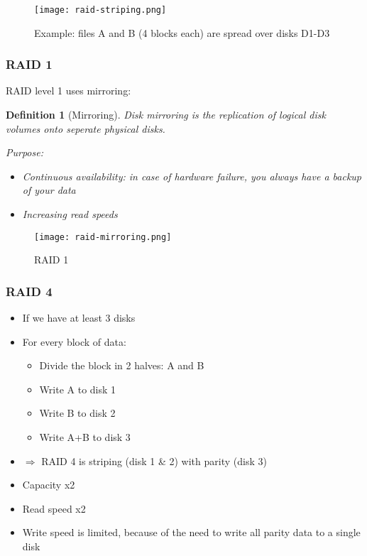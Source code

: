 \documentclass{article}
\newtheorem{theorem}{Definition}[section]
\begin{document}
\begin{figure}[H]
    \centering
    \texttt{[image: raid-striping.png]}
    \caption{Example: files A and B (4 blocks each) are spread over disks D1-D3}
\end{figure}


\subsubsection{RAID 1}

RAID level 1 uses mirroring:

\begin{theorem}[Mirroring]
    Disk mirroring is the replication of logical disk volumes onto seperate physical disks.

    Purpose:

    \begin{itemize}
        \item Continuous availability: in case of hardware failure, you always have a backup of your data
        \item Increasing read speeds
    \end{itemize}
\end{theorem}

\begin{figure}[H]
    \centering
    \texttt{[image: raid-mirroring.png]}
    \caption{RAID 1}
\end{figure}


\subsubsection{RAID 4}

\begin{itemize}
    \item If we have at least 3 disks
    \item For every block of data:
    \begin{itemize}
        \item Divide the block in 2 halves: A and B
        \item Write A to disk 1
        \item Write B to disk 2
        \item Write A+B to disk 3
    \end{itemize}
    \item $\Rightarrow$ RAID 4 is striping (disk 1 \& 2) with parity (disk 3)
    \item Capacity x2
    \item Read speed x2
    \item Write speed is limited, because of the need to write all parity data to a single disk
\end{itemize}
\end{document}
